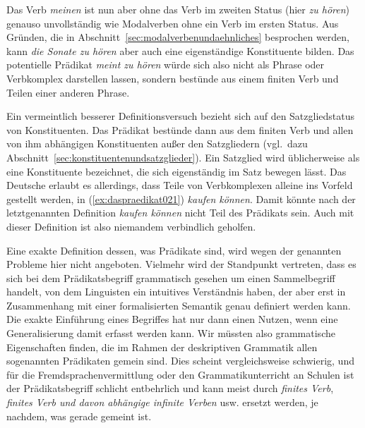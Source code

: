 Das Verb \textit{meinen} ist nun aber ohne das Verb im zweiten Status (hier \textit{zu hören}) genauso unvollständig wie Modalverben ohne ein Verb im ersten Status.
Aus Gründen, die in Abschnitt~\ref{sec:modalverbenundaehnliches} besprochen werden, kann \textit{die Sonate zu hören} aber auch eine eigenständige Konstituente bilden.
Das potentielle Prädikat \textit{meint zu hören} würde sich also nicht als Phrase oder Verbkomplex darstellen lassen, sondern bestünde aus einem finiten Verb und Teilen einer anderen Phrase.


\label{abs:daspraedikat020}Ein vermeintlich besserer Definitionsversuch bezieht sich auf den Satzgliedstatus von Konstituenten.
Das Prädikat bestünde dann aus dem finiten Verb und allen von ihm abhängigen Konstituenten außer den Satzgliedern (vgl.\ dazu Abschnitt~\ref{sec:konstituentenundsatzglieder}).
Ein Satzglied wird üblicherweise als eine Konstituente bezeichnet, die sich eigenständig im Satz bewegen lässt.
Das Deutsche erlaubt es allerdings, dass Teile von Verbkomplexen alleine ins Vorfeld gestellt werden, in (\ref{ex:daspraedikat021}) \zB \textit{kaufen können}.
Damit könnte nach der letztgenannten Definition \textit{kaufen können} nicht Teil des Prädikats sein.
Auch mit dieser Definition ist also niemandem verbindlich geholfen.

\begin{exe}
\end{exe}

Eine exakte Definition dessen, was Prädikate sind, wird wegen der genannten Probleme hier nicht angeboten.
Vielmehr wird der Standpunkt vertreten, dass es sich bei dem Prädikatsbegriff grammatisch gesehen um einen Sammelbegriff handelt, von dem Linguisten ein intuitives Verständnis haben, der aber erst in Zusammenhang mit einer formalisierten Semantik genau definiert werden kann.
Die exakte Einführung eines Begriffes hat nur dann einen Nutzen, wenn eine Generalisierung damit erfasst werden kann.
Wir müssten also grammatische Eigenschaften finden, die im Rahmen der deskriptiven Grammatik allen sogenannten Prädikaten gemein sind.
Dies scheint vergleichsweise schwierig, und für die Fremdsprachenvermittlung oder den Grammatikunterricht an Schulen ist der Prädikatsbegriff schlicht entbehrlich und kann meist durch \textit{finites Verb}, \textit{finites Verb und davon abhängige infinite Verben} usw. ersetzt werden, je nachdem, was gerade gemeint ist.

